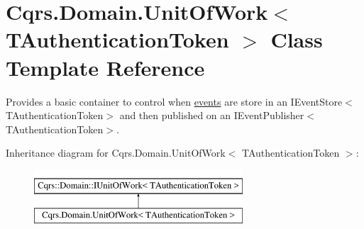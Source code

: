 \hypertarget{classCqrs_1_1Domain_1_1UnitOfWork}{}\section{Cqrs.\+Domain.\+Unit\+Of\+Work$<$ T\+Authentication\+Token $>$ Class Template Reference}
\label{classCqrs_1_1Domain_1_1UnitOfWork}


Provides a basic container to control when \hyperlink{}{events} are store in an I\+Event\+Store$<$\+T\+Authentication\+Token$>$ and then published on an I\+Event\+Publisher$<$\+T\+Authentication\+Token$>$.  


Inheritance diagram for Cqrs.\+Domain.\+Unit\+Of\+Work$<$ T\+Authentication\+Token $>$\+:\begin{figure}[H]
\begin{center}
\leavevmode
\includegraphics[height=2.000000cm]{classCqrs_1_1Domain_1_1UnitOfWork}
\end{center}
\end{figure}
